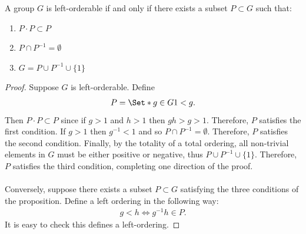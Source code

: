 \begin{proposition} A group $G$ is left-orderable if and only if there exists a subset $P\subset{}G$ such that:
\begin{enumerate}
\item $P\cdot{}P\subset{}P$
\item $P\cap{}P^{-1}=\emptyset{}$
\item $G=P\cup{}P^{-1}\cup{}\{ 1 \}$
\end{enumerate}
\label{proposition:poscone}
\end{proposition}
\begin{proof} Suppose $G$ is left-orderable. Define
\begin{align*}
P=\Set*{g\in{}G}{1<g}.
\end{align*}
Then $P\cdot{}P\subset{}P$ since if $g>1$ and $h>1$ then $gh>g>1$. Therefore, $P$ satisfies the first condition. If $g>1$ then $g^{-1}<1$ and so $P\cap{}P^{-1}=\emptyset{}$. Therefore, $P$ satisfies the second condition. Finally, by the totality of a total ordering, all non-trivial elements in $G$ must be either positive or negative, thus $P\cup{}P^{-1}\cup{}\{ 1 \}$. Therefore, $P$ satisfies the third condition, completing one direction of the proof.\\
\\
Conversely, suppose there exists a subset $P\subset{}G$ satisfying the three conditions of the proposition. Define a left ordering in the following way:
\begin{align*}
g<h\Leftrightarrow{}g^{-1}h\in{}P.
\end{align*}
It is easy to check this defines a left-ordering.
\end{proof}

